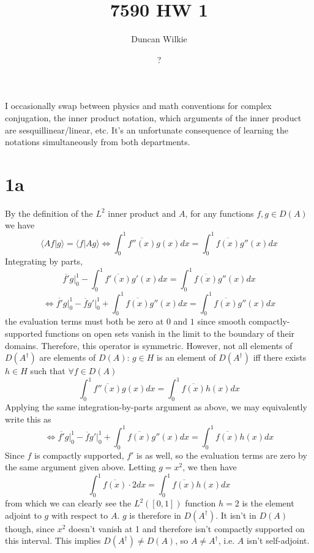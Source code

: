 \documentclass{article}
\title{7590 HW 1}
\author{Duncan Wilkie}
\date{?}
\begin{document}
\maketitle
I occasionally swap between physics and math conventions for complex conjugation, the inner product notation,
which arguments of the inner product are sesquillinear/linear, etc.
It's an unfortunate consequence of learning the notations simultaneously from both departments.
\section*{1a}
By the definition of the $L^2$ inner product and $A$, for any functions $f,g\in D(A)$ we have
\[\langle Af|g \rangle=\langle f|Ag \rangle\Leftrightarrow \int_0^1\overline{f''(x)}g(x)dx=\int_0^1\overline{f(x)}g''(x)dx \]
Integrating by parts,
\[\overline{f'}g\bigg|_0^1-\int_0^1\overline{f'(x)}g'(x)dx=\int_0^1\overline{f(x)}g''(x)dx\]
\[\Leftrightarrow \overline{f'}g\bigg|_0^1-\overline{f}g'\bigg|_0^1+\int_0^1\overline{f(x)}g''(x)dx=\int_0^1\overline{f(x)}g''(x)dx\]
the evaluation terms  must both be zero at $0$ and $1$ since smooth compactly-supported functions on open sets vanish
in the limit to the boundary of their domains.
Therefore, this operator is symmetric.
However, not all elements of $D(A^{\dagger})$ are elements of $D(A)$: $g\in H$ is an element of $D(A^{\dagger})$ iff there exists
$h\in H$ such that $\forall f\in D(A)$
\[
  \int_{0}^{1}\overline{f''(x)}g(x)dx=\int_{0}^{1}\overline{f(x)}h(x)dx
\]
Applying the same integration-by-parts argument as above, we may equivalently write this as
\[\Leftrightarrow \overline{f'}g\bigg|_0^1-\overline{f}g'\bigg|_0^1+\int_0^1\overline{f(x)}g''(x)dx=\int_0^1\overline{f(x)}h(x)dx\]
Since $f$ is compactly supported, $f'$ is as well, so the evaluation terms are zero by the same argument given above.
Letting $g=x^{2}$, we then have
\[\int_{0}^{1}\overline{f(x)}\cdot 2dx=\int_{0}^{1}\overline{f(x)}h(x)dx\]
from which we can clearly see the $L^{2}([0,1])$ function $h=2$ is the element adjoint to $g$ with respect to $A$.
$g$ is therefore in $D(A^{\dagger})$.
It isn't in $D(A)$ though, since $x^{2}$ doesn't vanish at 1 and therefore isn't compactly supported on this interval.
This implies $D(A^{\dagger})\neq D(A)$, so $A\neq A^{\dagger}$, i.e. $A$ isn't self-adjoint.
\end{document}
